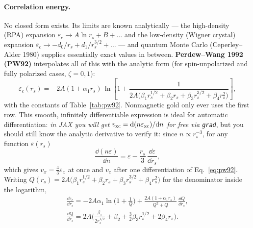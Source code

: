 \paragraph{Correlation energy.} No closed form exists. Its limits are known
analytically --- the high-density (RPA) expansion
$\varepsilon_c \to A \ln r_s + B + \dots$ and the low-density (Wigner
crystal) expansion $\varepsilon_c \to -d_0/r_s + d_1/r_s^{3/2} + \dots$ ---
and quantum Monte Carlo (Ceperley--Alder 1980) supplies essentially exact
values in between. \textbf{Perdew--Wang 1992 (PW92)} interpolates all of this
with the analytic form (for spin-unpolarized and fully polarized cases,
$\zeta = 0, 1$):
\begin{equation}
\varepsilon_c(r_s)
= -2 A (1 + \alpha_1 r_s)\,
\ln\!\left[1 + \frac{1}{2A\big(\beta_1 r_s^{1/2} + \beta_2 r_s
+ \beta_3 r_s^{3/2} + \beta_4 r_s^{2}\big)}\right],
\label{eq:pw92}
\end{equation}
with the constants of Table~\ref{tab:pw92}. Nonmagnetic gold only ever
uses the first row. This smooth, infinitely differentiable expression is ideal
for automatic differentiation: \emph{in JAX you will get $v_{\mathrm{xc}} =
\mathrm{d}(n\varepsilon_{\mathrm{xc}})/\mathrm{d} n$ for free via \texttt{grad}}, but you
should still know the analytic derivative to verify it: since
$n \propto r_s^{-3}$, for any function $\varepsilon(r_s)$
\begin{equation}
\frac{\dd (n\varepsilon)}{\dd n}
= \varepsilon - \frac{r_s}{3}\,\frac{\dd \varepsilon}{\dd r_s},
\label{eq:rsderiv}
\end{equation}
which gives $v_x = \tfrac43\varepsilon_x$ at once and $v_c$ after one
differentiation of Eq.~\eqref{eq:pw92}. Writing $Q(r_s) = 2A\big(\beta_1
r_s^{1/2} + \beta_2 r_s + \beta_3 r_s^{3/2} + \beta_4 r_s^2\big)$ for the
denominator inside the logarithm,
\begin{equation}
\begin{gathered}
\frac{\dd\varepsilon_c}{\dd r_s}
= -2A\alpha_1 \ln\!\Big(1 + \frac{1}{Q}\Big)
+ \frac{2A(1+\alpha_1 r_s)}{Q^2 + Q}\,\frac{\dd Q}{\dd r_s},
\\
\frac{\dd Q}{\dd r_s} = 2A\Big(\frac{\beta_1}{2 r_s^{1/2}} + \beta_2
+ \tfrac32\beta_3 r_s^{1/2} + 2\beta_4 r_s\Big).
\end{gathered}
\label{eq:pw92deriv}
\end{equation}

